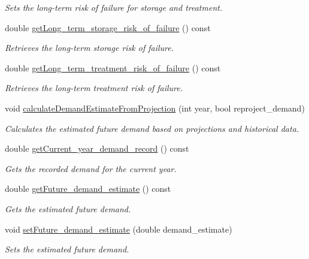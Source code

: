 \begin{DoxyCompactItemize}
\begin{DoxyCompactList}\small\item\em Sets the long-\/term risk of failure for storage and treatment. \end{DoxyCompactList}\item 
double \mbox{\hyperlink{classUtility_a3c35a6860d65f40648238b2719377bf6}{get\+Long\+\_\+term\+\_\+storage\+\_\+risk\+\_\+of\+\_\+failure}} () const
\begin{DoxyCompactList}\small\item\em Retrieves the long-\/term storage risk of failure. \end{DoxyCompactList}\item 
double \mbox{\hyperlink{classUtility_aade5d5dc1ea04641ef9f709542848316}{get\+Long\+\_\+term\+\_\+treatment\+\_\+risk\+\_\+of\+\_\+failure}} () const
\begin{DoxyCompactList}\small\item\em Retrieves the long-\/term treatment risk of failure. \end{DoxyCompactList}\item 
void \mbox{\hyperlink{classUtility_a10f96b2f34ba7e6e12a8e8fb98b8534a}{calculate\+Demand\+Estimate\+From\+Projection}} (int year, bool reproject\+\_\+demand)
\begin{DoxyCompactList}\small\item\em Calculates the estimated future demand based on projections and historical data. \end{DoxyCompactList}\item 
double \mbox{\hyperlink{classUtility_a67627ab2e5f526a979099bb6b2d2f13f}{get\+Current\+\_\+year\+\_\+demand\+\_\+record}} () const
\begin{DoxyCompactList}\small\item\em Gets the recorded demand for the current year. \end{DoxyCompactList}\item 
double \mbox{\hyperlink{classUtility_a9ca028b10b1c466e010dcacca6a0b24e}{get\+Future\+\_\+demand\+\_\+estimate}} () const
\begin{DoxyCompactList}\small\item\em Gets the estimated future demand. \end{DoxyCompactList}\item 
void \mbox{\hyperlink{classUtility_aa465673857827435f256bde97d36b77d}{set\+Future\+\_\+demand\+\_\+estimate}} (double demand\+\_\+estimate)
\begin{DoxyCompactList}\small\item\em Sets the estimated future demand. \end{DoxyCompactList}\item 

\end{DoxyCompactItemize}
